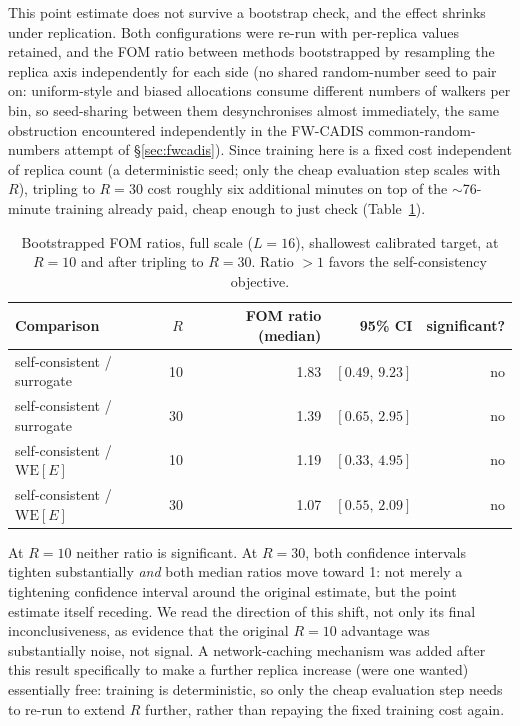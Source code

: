 \documentclass[11pt]{article}
\begin{document}
	This point estimate does not survive a bootstrap check, and the effect shrinks
		under replication. Both configurations were re-run with per-replica values retained, and
	the FOM ratio between methods bootstrapped by resampling the replica axis independently for
	each side (no shared random-number seed to pair on: uniform-style and biased allocations
	consume different numbers of walkers per bin, so seed-sharing between them desynchronises
	almost immediately, the same obstruction encountered independently in the FW-CADIS
	common-random-numbers attempt of \S\ref{sec:fwcadis}). Since training here is a fixed cost
	independent of replica count (a deterministic seed; only the cheap evaluation step scales
	with $R$), tripling to $R=30$ cost roughly six additional minutes on top of the
	$\sim$76-minute training already paid, cheap enough to just check
	(Table~\ref{tab:kimcaiboot}).
	
	\begin{table}[h]
		\centering\small
		\caption{Bootstrapped FOM ratios, full scale ($L=16$), shallowest calibrated target, at
			$R=10$ and after tripling to $R=30$. Ratio $>1$ favors the self-consistency objective.}
		\label{tab:kimcaiboot}
		\begin{tabular}{lrrrr}
			\toprule
			Comparison & $R$ & FOM ratio (median) & 95\% CI & significant? \\
			\midrule
			self-consistent / surrogate & 10 & 1.83 & $[0.49,\,9.23]$ & no \\
			self-consistent / surrogate & 30 & 1.39 & $[0.65,\,2.95]$ & no \\
			self-consistent / $\mathrm{WE}[E]$ & 10 & 1.19 & $[0.33,\,4.95]$ & no \\
			self-consistent / $\mathrm{WE}[E]$ & 30 & 1.07 & $[0.55,\,2.09]$ & no \\
			\bottomrule
		\end{tabular}
	\end{table}
	
	At $R=10$ neither ratio is significant. At $R=30$, both confidence intervals tighten
	substantially \emph{and} both median ratios move toward 1: not merely a tightening
	confidence interval around the original estimate, but the point estimate itself receding.
	We read the direction of this shift, not only its final inconclusiveness, as evidence that
	the original $R=10$ advantage was substantially noise, not signal. A network-caching
	mechanism was added after this result specifically to make a further replica increase (were
	one wanted) essentially free: training is deterministic, so only the cheap evaluation step
	needs to re-run to extend $R$ further, rather than repaying the fixed training cost again.
	
\end{document}
